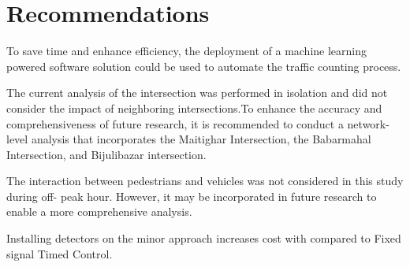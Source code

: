 \section{Recommendations}
To save time and enhance efficiency, the deployment of a machine learning powered software solution could be used to automate the traffic counting process. 

The current analysis of the intersection was performed in isolation 
and did not consider the impact of neighboring intersections.To 
enhance the accuracy and comprehensiveness of future research, it 
is recommended to conduct a network-level analysis that incorporates 
the Maitighar Intersection, the Babarmahal Intersection, and 
Bijulibazar intersection. 

The interaction between pedestrians and vehicles was not considered 
in this study during off- peak hour. However, it may be incorporated 
in future research to enable a more comprehensive analysis.

Installing detectors on the minor approach increases cost with compared 
to Fixed signal Timed Control.
